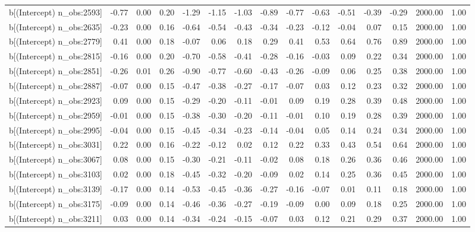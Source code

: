 \begin{table}[ht]
\begin{tabular}{rrrrrrrrrrrrrrr}
  b[(Intercept) n\_obs:2593] & -0.77 & 0.00 & 0.20 & -1.29 & -1.15 & -1.03 & -0.89 & -0.77 & -0.63 & -0.51 & -0.39 & -0.29 & 2000.00 & 1.00 \\ 
  b[(Intercept) n\_obs:2635] & -0.23 & 0.00 & 0.16 & -0.64 & -0.54 & -0.43 & -0.34 & -0.23 & -0.12 & -0.04 & 0.07 & 0.15 & 2000.00 & 1.00 \\ 
  b[(Intercept) n\_obs:2779] & 0.41 & 0.00 & 0.18 & -0.07 & 0.06 & 0.18 & 0.29 & 0.41 & 0.53 & 0.64 & 0.76 & 0.89 & 2000.00 & 1.00 \\ 
  b[(Intercept) n\_obs:2815] & -0.16 & 0.00 & 0.20 & -0.70 & -0.58 & -0.41 & -0.28 & -0.16 & -0.03 & 0.09 & 0.22 & 0.34 & 2000.00 & 1.00 \\ 
  b[(Intercept) n\_obs:2851] & -0.26 & 0.01 & 0.26 & -0.90 & -0.77 & -0.60 & -0.43 & -0.26 & -0.09 & 0.06 & 0.25 & 0.38 & 2000.00 & 1.00 \\ 
  b[(Intercept) n\_obs:2887] & -0.07 & 0.00 & 0.15 & -0.47 & -0.38 & -0.27 & -0.17 & -0.07 & 0.03 & 0.12 & 0.23 & 0.32 & 2000.00 & 1.00 \\ 
  b[(Intercept) n\_obs:2923] & 0.09 & 0.00 & 0.15 & -0.29 & -0.20 & -0.11 & -0.01 & 0.09 & 0.19 & 0.28 & 0.39 & 0.48 & 2000.00 & 1.00 \\ 
  b[(Intercept) n\_obs:2959] & -0.01 & 0.00 & 0.15 & -0.38 & -0.30 & -0.20 & -0.11 & -0.01 & 0.10 & 0.19 & 0.28 & 0.39 & 2000.00 & 1.00 \\ 
  b[(Intercept) n\_obs:2995] & -0.04 & 0.00 & 0.15 & -0.45 & -0.34 & -0.23 & -0.14 & -0.04 & 0.05 & 0.14 & 0.24 & 0.34 & 2000.00 & 1.00 \\ 
  b[(Intercept) n\_obs:3031] & 0.22 & 0.00 & 0.16 & -0.22 & -0.12 & 0.02 & 0.12 & 0.22 & 0.33 & 0.43 & 0.54 & 0.64 & 2000.00 & 1.00 \\ 
  b[(Intercept) n\_obs:3067] & 0.08 & 0.00 & 0.15 & -0.30 & -0.21 & -0.11 & -0.02 & 0.08 & 0.18 & 0.26 & 0.36 & 0.46 & 2000.00 & 1.00 \\ 
  b[(Intercept) n\_obs:3103] & 0.02 & 0.00 & 0.18 & -0.45 & -0.32 & -0.20 & -0.09 & 0.02 & 0.14 & 0.25 & 0.36 & 0.45 & 2000.00 & 1.00 \\ 
  b[(Intercept) n\_obs:3139] & -0.17 & 0.00 & 0.14 & -0.53 & -0.45 & -0.36 & -0.27 & -0.16 & -0.07 & 0.01 & 0.11 & 0.18 & 2000.00 & 1.00 \\ 
  b[(Intercept) n\_obs:3175] & -0.09 & 0.00 & 0.14 & -0.46 & -0.36 & -0.27 & -0.19 & -0.09 & 0.00 & 0.09 & 0.18 & 0.25 & 2000.00 & 1.00 \\ 
  b[(Intercept) n\_obs:3211] & 0.03 & 0.00 & 0.14 & -0.34 & -0.24 & -0.15 & -0.07 & 0.03 & 0.12 & 0.21 & 0.29 & 0.37 & 2000.00 & 1.00 \\ 

\end{tabular}
\end{table}
